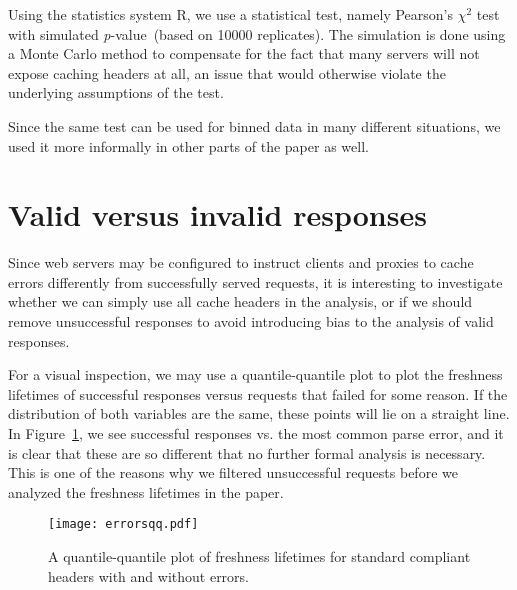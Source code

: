 \documentclass[a4paper,english]{article}
\newcommand{\pvalue}{\textit{p}-value\ }
\begin{document}
Using the statistics system R\cite{kn:r}, we use a statistical test,
namely Pearson's $\chi^2$ test with simulated \pvalue (based on 10000
replicates). The simulation is done using a Monte Carlo method to
compensate for the fact that many servers will not expose caching
headers at all, an issue that would otherwise violate the underlying
assumptions of the test.

Since the same test can be used for binned data in many different
situations, we used it more informally in other parts of the paper as well.

\section{Valid versus invalid responses}\label{app:qqplot}

Since web servers may be configured to instruct clients and proxies to
cache errors differently from successfully served requests, it is
interesting to investigate whether we can simply use all cache headers
in the analysis, or if we should remove unsuccessful responses to
avoid introducing bias to the analysis of valid responses.
 
For a visual inspection, we may use a quantile-quantile plot to plot
the freshness lifetimes of successful responses versus requests that
failed for some reason. If the distribution of both variables are the
same, these points will lie on a straight line. In
Figure~\ref{fig:errorsqq}, we see successful responses vs. the most
common parse error, and it is clear that these are so different that
no further formal analysis is necessary. This is one of the reasons
why we filtered unsuccessful requests before we analyzed the freshness
lifetimes in the paper.


\begin{figure}[h]
  \centerline{%
    \texttt{[image: errorsqq.pdf]}}
  \caption{A quantile-quantile plot of freshness lifetimes for
    standard compliant headers with and without errors.}
  \label{fig:errorsqq}
\end{figure}



%

%
%

\end{document}
